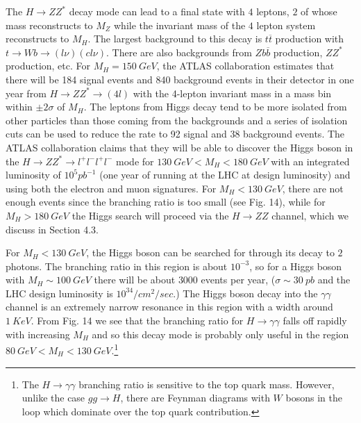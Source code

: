 The  $H\rightarrow Z Z^*$ decay mode can lead to a final state
with $4$ leptons, $2$ of whose mass reconstructs to $M_Z$ while the
invariant mass of the $4$ lepton system reconstructs to $M_H$.  The
largest background to this decay is $t \overline{t}$ production
with $t\rightarrow W b \rightarrow (l \nu) ( c l \nu)$.  There are also
backgrounds from $Z b \overline{b}$ production, $Z Z^{*}$ production,
etc.
For $M_H=150~GeV$, the  ATLAS collaboration
estimates that there will be 184 signal events and 840 background
events in their detector in one year from $H\rightarrow Z Z^*
\rightarrow (4l)$ with the 4-lepton invariant mass in a
mass bin within $\pm 2 \sigma$ of $M_H$.\cite{atlas}
  The leptons from Higgs decay
tend to be more isolated from other particles than those coming
from the backgrounds and a series of isolation cuts
can be used to reduce the rate
to 92 signal and 38 background events.
 The ATLAS collaboration
claims that they will be able to discover the Higgs boson in the
$H\rightarrow Z Z^*\rightarrow l^+l^-l^+l^-$ mode for
$130~GeV < M_H < 180~GeV$ with an integrated luminosity
of $10^5 pb^{-1}$ (one year of running at the LHC
at design luminosity) and using both the electron and muon
signatures.  For $M_H< 130~GeV$, there are not
enough events since the branching ratio is too small (see Fig. 14),
while for $M_H> 180~GeV$ the Higgs search will proceed via the
$H\rightarrow ZZ$ channel, which we discuss in Section 4.3.

For $M_H< 130~GeV$, the Higgs boson can be searched for through
its decay to $2$ photons.  The branching ratio in this region
is about $10^{-3}$, so for a Higgs boson with $M_H\sim 100~GeV$
there will be about $3000$ events per year, ($\sigma\sim 30~ pb$ and
the LHC design luminosity is $10^{34}/cm^2/sec$.)  The
Higgs boson decay into the $\gamma \gamma$ channel
is an extremely narrow resonance in this region  with
a width around $1~KeV$.  From Fig. 14 we see that the branching
ratio for $H\rightarrow \gamma\gamma$ falls off rapidly with
increasing $M_H$ and so this decay mode is probably only useful in
the region $80~GeV < M_H < 130~GeV$.\footnote{The $H\rightarrow
\gamma\gamma$ branching ratio is sensitive to the top quark mass.
However, unlike the case $gg\rightarrow H$, there are
Feynman diagrams with $W$ bosons
in the loop which dominate over the top quark contribution.}

